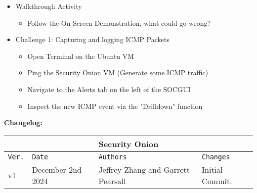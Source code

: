\documentclass[12pt]{article}
\begin{document}
\begin{itemize}
\begin{itemize}
		\end{itemize}
	\item Walkthrough Activity
		\begin{itemize}
			\item Follow the On-Screen Demonstration, what could go wrong?
		\end{itemize}
	\item Challenge 1: Capturing and logging ICMP Packets
		\begin{itemize}
            \item Open Terminal on the Ubuntu VM
			\item Ping the Security Onion VM (Generate some ICMP traffic)
			\item Navigate to the Alerts tab on the left of the SOCGUI
            \item Inspect the new ICMP event via the "Drilldown" function 
		\end{itemize}
\end{itemize}
\pagebreak	
\textbf{Changelog:}
\label{changelog}
\vspace{6mm}


\begin{tabular}{ |p{1cm}|p{3cm}|p{3cm}|p{5cm}|  }
\hline
\multicolumn{4}{|c|}{Security Onion} \\
\hline
\texttt{Ver.} & \texttt{Date} & \texttt{Authors} & \texttt{Changes} \\
\hline
v1 & December 2nd 2024 & Jeffrey Zhang and Garrett Pearsall & Initial Commit.  \\
\hline
\end{tabular}

\pagebreak

\end{document}
